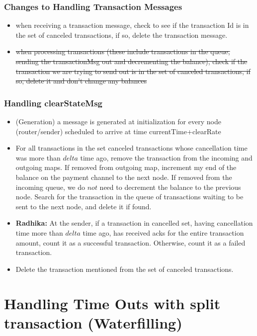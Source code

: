 \documentclass[a4paper]{article}
\newcommand{\radhika}[1]{{\color{red} \textbf{Radhika:} {#1}}}
\begin{document}
\subsubsection{ Changes to Handling Transaction Messages}
    \begin{itemize}
        \item when receiving a transaction message, check to see if the transaction Id is in the set of canceled transactions, if so, delete the transaction message.
        \item \sout{ when processing transactions (these include transactions in the queue, sending the transactionMsg out and decrementing the balance), check if the transaction we are trying to send out is in the set of canceled transactions, if so, delete it and don’t change any balances}

    \end{itemize}
\subsubsection{ Handling clearStateMsg}
    \begin{itemize}
        \item (Generation) a message is generated at initialization for every node (router/sender) scheduled to arrive at time  currentTime+clearRate
        \item For all transactions in the set canceled transactions whose cancellation time  was more than $delta$ time ago, remove the transaction from the incoming and outgoing maps. If removed from outgoing map, increment my end of the balance on the payment channel to the next node. If removed from the incoming queue, we do $not$ need to decrement the balance to the previous node. Search for the transaction in the queue of transactions waiting to be sent to the next node, and delete it if found.
				\item \radhika{At the sender, if a transaction in cancelled set, having cancellation time more than $delta$ time ago, has received acks for the entire transaction amount, count it as a successful transaction. Otherwise, count it as a failed transaction.} 
        \item Delete the transaction mentioned from the set of canceled transactions. 
    \end{itemize}

\section{Handling Time Outs with split transaction (Waterfilling)}
\end{document}
